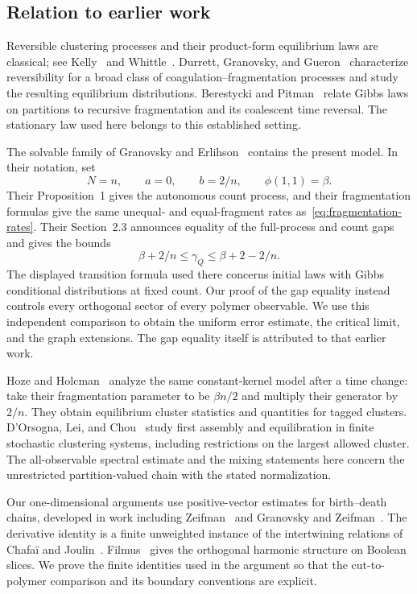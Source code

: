 \subsection{Relation to earlier work}

Reversible clustering processes and their product-form equilibrium
laws are classical; see Kelly~\cite[Chapter~8]{Kelly1979} and
Whittle~\cite{Whittle1986}. Durrett, Granovsky, and
Gueron~\cite{DurrettGranovskyGueron1999} characterize reversibility
for a broad class of coagulation--fragmentation processes and study
the resulting equilibrium distributions. Berestycki and
Pitman~\cite{BerestyckiPitman2007} relate Gibbs laws on partitions
to recursive fragmentation and its coalescent time reversal.
The stationary law used here belongs to this established setting.

The solvable family of Granovsky and
Erlihson~\cite{GranovskyErlihson2009} contains the present model.
In their notation, set
\[
 N=n,\qquad a=0,\qquad b=2/n,\qquad\phi(1,1)=\beta.
\]
Their Proposition~1 gives the autonomous count process, and their
fragmentation formulas give the same unequal- and equal-fragment
rates as~\eqref{eq:fragmentation-rates}. Their Section~2.3 announces
equality of the full-process and count gaps and gives the bounds
\[
 \beta+2/n\le\gamma_Q\le\beta+2-2/n.
\]
The displayed transition formula used there concerns initial laws
with Gibbs conditional distributions at fixed count. Our proof of
the gap equality instead controls every orthogonal sector of every
polymer observable. We use this independent comparison to obtain
the uniform error estimate, the critical limit, and the graph
extensions. The gap equality itself is attributed to that earlier
work.

Hoze and Holcman~\cite{HozeHolcman2018} analyze the same constant-kernel
model after a time change: take their fragmentation parameter to be
$\beta n/2$ and multiply their generator by $2/n$. They obtain
equilibrium cluster statistics and quantities for tagged clusters.
D'Orsogna, Lei, and Chou~\cite{DOrsognaLeiChou2015} study first
assembly and equilibration in finite stochastic clustering systems,
including restrictions on the largest allowed cluster. The
all-observable spectral estimate and the mixing statements here
concern the unrestricted partition-valued chain with the stated
normalization.

Our one-dimensional arguments use positive-vector estimates for
birth--death chains, developed in work including
Zeifman~\cite{Zeifman1991} and Granovsky and
Zeifman~\cite{GranovskyZeifman2000,GranovskyZeifman2005}.
The derivative identity is a finite unweighted instance of the
intertwining relations of Chafa\"i and Joulin~\cite{ChafaiJoulin2013}.
Filmus~\cite{Filmus2016} gives the orthogonal harmonic structure on
Boolean slices. We prove the finite identities used in the argument
so that the cut-to-polymer comparison and its boundary conventions
are explicit.

